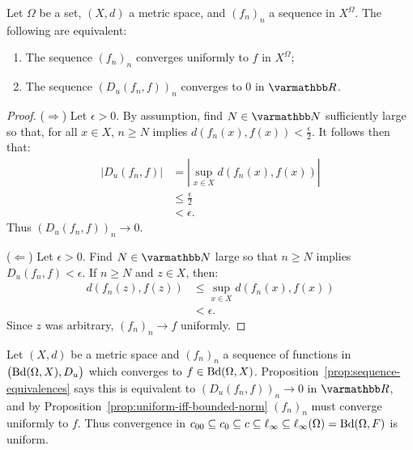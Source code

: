     \begin{proposition}\label{prop:uniform-iff-bounded-norm}
        Let $\Omega$ be a set, $(X,d)$ a metric space, and $(f_n)_n$ a sequence in $X^\Omega$. The following are equivalent:
            \begin{enumerate}[label = (\arabic*),itemsep=1pt,topsep=3pt]
                \item The sequence $(f_n)_n$ converges uniformly to $f$ in $X^\Omega$;
                \item The sequence $(D_u(f_n,f))_n$ converges to 0 in $\bfR$.
            \end{enumerate}
    \end{proposition}
        \begin{proof}
            ($\Rightarrow$) Let $\epsilon > 0$. By assumption, find $N \in \bfN$ sufficiently large so that, for all $x \in X$, $n \geq N$ implies $d(f_n(x),f(x)) < \frac{\epsilon}{2}$. It follows then that:
                \begin{equation*}
                \begin{split}
                    |D_u(f_n,f)|
                    & = \left| \sup_{x \in X}d(f_n(x),f(x)) \right| \\
                    & \leq \frac{\epsilon}{2} \\
                    & < \epsilon.
                \end{split}
                \end{equation*}
            Thus $(D_u(f_n,f))_n \rightarrow 0$.

            ($\Leftarrow$) Let $\epsilon > 0$. Find $N \in \bfN$ large so that $n \geq N$ implies $D_u(f_n,f) < \epsilon$. If $n \geq N$ and $z \in X$, then:
                \begin{equation*}
                \begin{split}
                    d(f_n(z),f(z))
                    & \leq \sup_{x \in X}d(f_n(x),f(x)) \\
                    & < \epsilon.
                \end{split}
                \end{equation*}
            Since $z$ was arbitrary, $(f_n)_n \rightarrow f$ uniformly.
        \end{proof}

    \begin{example}
        Let $(X,d)$ be a metric space and $(f_n)_n$ a sequence of functions in $\bigl(\operatorname{Bd}(\Omega,X), D_u\bigr)$ which converges to $f \in \operatorname{Bd}(\Omega,X)$. Proposition~\ref{prop:sequence-equivalences} says this is equivalent to $(D_u(f_n,f))_n \rightarrow 0$ in $\bfR$, and by Proposition~\ref{prop:uniform-iff-bounded-norm} $(f_n)_n$ must converge uniformly to $f$. Thus convergence in $c_{00} \subseteq c_0 \subseteq c \subseteq \ell_\infty \subseteq \ell_{\infty}(\Omega) = \operatorname{Bd}(\Omega,F)$ is uniform.
    \end{example}

